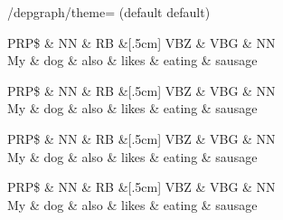 \documentclass[a4paper]{ltxdoc}
\begin{document}
\begin{key}{/depgraph/theme= (default default)}
\begin{codeexample}[]
\begin{dependency}[theme=brazil]
   \begin{deptext}[column sep=.5cm, row sep=.1ex]
      PRP\$ \& NN \& RB \&[.5cm] VBZ \& VBG \& NN \\
      My \& dog \& also \& likes \& eating \& sausage \\
   \end{deptext}
\end{dependency}
\end{codeexample}

\begin{codeexample}[]
\begin{dependency}[theme=grassy]
   \begin{deptext}[column sep=.5cm, row sep=.1ex]
      PRP\$ \& NN \& RB \&[.5cm] VBZ \& VBG \& NN \\
      My \& dog \& also \& likes \& eating \& sausage \\
   \end{deptext}
\end{dependency}
\end{codeexample}

\begin{codeexample}[]
\begin{dependency}[theme=iron]
   \begin{deptext}[column sep=.5cm, row sep=.1ex]
      PRP\$ \& NN \& RB \&[.5cm] VBZ \& VBG \& NN \\
      My \& dog \& also \& likes \& eating \& sausage \\
   \end{deptext}
\end{dependency}
\end{codeexample}

\begin{codeexample}[]
\begin{dependency}[theme=copper]
   \begin{deptext}[column sep=.5cm, row sep=.1ex]
      PRP\$ \& NN \& RB \&[.5cm] VBZ \& VBG \& NN \\
      My \& dog \& also \& likes \& eating \& sausage \\
   \end{deptext}
\end{dependency}
\end{codeexample}
\end{key}
\end{document}
